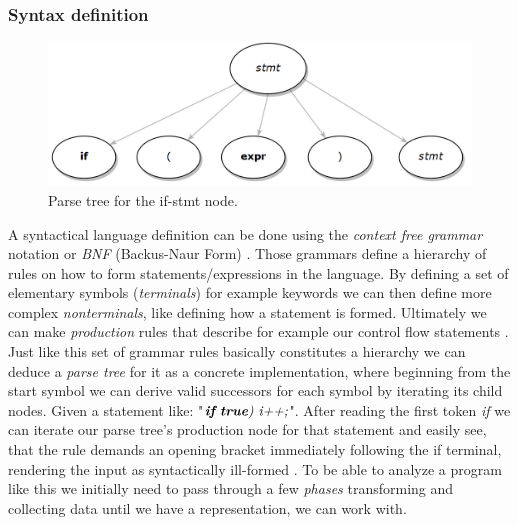 \subsubsection{Syntax definition}
\begin{figure}
	\begin{center}
		\includegraphics[width=.32\textwidth, height=0.12\textheight]{PICs/parse_tree}
	\end{center}
	\caption{Parse tree for the if-stmt node.}\label{parse_tree}
\end{figure}
A syntactical language definition can be done using the \textit{context free grammar} notation or \textit{BNF} (Backus-Naur Form) . Those grammars define a hierarchy of rules on how to form statements/expressions in the language. By defining a set of elementary symbols (\textit{terminals}) for example keywords we can then define more complex \textit{nonterminals}, like defining how a statement is formed. Ultimately we can make \textit{production} rules that describe for example our control flow statements . Just like this set of grammar rules basically constitutes a hierarchy we can deduce a \textit{parse tree} for it as a concrete implementation, where beginning from the start symbol we can derive valid successors for each symbol by iterating its child nodes. Given a statement like: "$\textit{\textbf{if} \textbf{true}) i++;}$". After reading the first token \textit{if} we can iterate our parse tree's production node for that statement and easily see, that the rule demands an opening bracket immediately following the if terminal, rendering the input as syntactically ill-formed . To be able to analyze a program like this we initially need to pass through a few \textit{phases} transforming and collecting data until we have a representation, we can work with.

